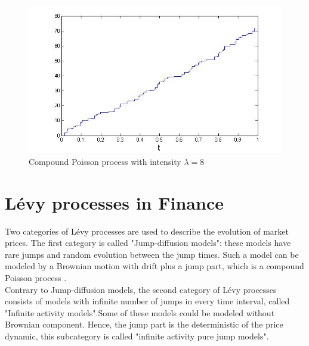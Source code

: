 \documentclass[12pt]{report}
\begin{document}
\begin{figure}[h]

\centering
\includegraphics[scale=0.7]{compoisson.jpg} 
\caption{Compound Poisson process with intensity $\lambda=8$
}
\end{figure}

\section{Lévy processes in Finance}

Two categories of Lévy processes are used to describe the evolution of market prices. 
The first category is called "Jump-diffusion models": these models have rare jumps and random evolution between the jump times. 
Such a model can be modeled by a Brownian motion with drift plus a jump part, which is a compound Poisson process .\\

Contrary to Jump-diffusion models, the second category of Lévy processes consists of models with infinite number of jumps in every time interval,
 called "Infinite activity models".Some of these models could be modeled without Brownian component. Hence, the jump part is the deterministic of the price dynamic, this subcategory is called "infinite activity pure jump models". 
\end{document}
